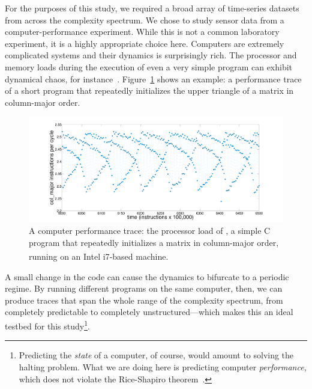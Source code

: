 For the purposes of this study, we required a broad array of
time-series datasets from across the complexity spectrum.  We chose to
study sensor data from a computer-performance experiment.  While this
is not a common laboratory experiment, it is a highly appropriate
choice here.  Computers are extremely complicated systems and their
dynamics is surprisingly rich.
The processor and memory loads during the execution of even a very
simple program can exhibit dynamical chaos, for
instance~\cite{mytkowicz09}.  Figure~\ref{fig:col-ipc} shows an
example: a performance trace of a short program that repeatedly
initializes the upper triangle of a matrix in column-major order.
%
 \begin{figure}[htp]
    \centering
    \includegraphics[width=\columnwidth]{figs/colshortts}
    \caption{A computer performance trace: the processor load of \col,
      a simple C program that repeatedly initializes a matrix in
      column-major order, running on an Intel
      i7\textsuperscript{\textregistered}-based machine.}
   \label{fig:col-ipc}
  \end{figure}
%
A small change in the code can cause the dynamics to bifurcate to a
periodic regime.  
% 
By running different programs on the same computer, then, we can
produce traces that span the whole range of the complexity spectrum,
from completely predictable to completely unstructured---which makes
this an ideal testbed for this study\footnote{Predicting the
  \emph{state} of a computer, of course, would amount to solving the
  halting problem.  What we are doing here is predicting computer
  \emph{performance}, which does not violate the Rice-Shapiro
  theorem~\cite{hopcroft2007}.}.


